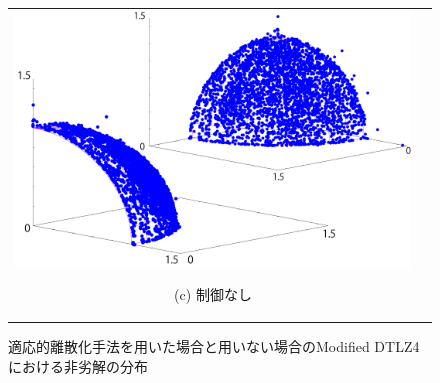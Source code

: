 \documentclass[../main/main]{subfiles}
\begin{document}
\begin{figure}[htbp]
\begin{tabular}{cc}
\begin{minipage}{0.33\hsize}
\includegraphics[width=1\linewidth]{../figures/multidtlz4_uc_double.pdf}
\begin{center}
{\footnotesize (c) 制御なし}
\end{center}
\end{minipage}
\end{tabular}
\caption{適応的離散化手法を用いた場合と用いない場合のModified DTLZ4における非劣解の分布}
\label{fig:nondoms_multidtlz4}
\end{figure}
\end{document}
